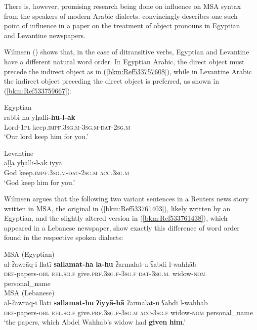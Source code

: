 \documentclass[output=paper]{langsci/langscibook}
\begin{document}
There is, however, promising research being done on influence on MSA syntax from the speakers of modern Arabic dialects. \citet{Wilmsen2010} convincingly describes one such point of influence in a paper on the treatment of object pronouns in Egyptian and Levantine newspapers.

Wilmsen (\citeyear[104]{Wilmsen2010}) shows that, in the case of ditransitive verbs, Egyptian and Levantine have a different natural word order. In Egyptian Arabic, the direct object must precede the indirect object as in (\ref{bkm:Ref533757608}), while in Levantine Arabic the indirect object preceding the direct object is preferred, as shown in (\ref{bkm:Ref533759667}):

\ea
\label{bkm:Ref533757608}Egyptian\\
\gll rabbi-na yḫalli\textbf{{}-hū-l-ak}\\
     Lord-\textsc{1pl} keep\textsc{.impf.3sg.m}{}-3\textsc{sg.m-dat-2sg.m}\\
\glt ‘Our lord keep him for you.’
\z

\ea\label{bkm:Ref533759667}Levantine\\
\gll aḷḷa yḫallī-l-ak iyyā\\
     God keep\textsc{.impf.3sg.m-dat-2sg.m} \textsc{acc.}3\textsc{sg.m} \\
\glt ‘God keep him for you.’\z

Wilmsen argues that the following two variant sentences in a Reuters news story written in MSA, the original in (\ref{bkm:Ref533761403}), likely written by an Egyptian, and the slightly altered version in (\ref{bkm:Ref533761438}), which appeared in a Lebanese newspaper, show exactly this difference of word order found in the respective spoken dialects:

\ea
\label{bkm:Ref533761403}MSA (Egyptian)\\
\gll al-ʔawrāq-i llatī \textbf{sallamat-hā} \textbf{la-hu} ʔarmalat-u ʕabdi l-wahhāb\\
     \textsc{def}{}-papers-\textsc{obl} \textsc{rel.sg.f} give.\textsc{prf.3sg.f-3sg.f} \textsc{dat-3sg.m.} widow-\textsc{nom} personal\_name\\
\z
\ea\label{bkm:Ref533761438}MSA (Lebanese)\\
\gll al-ʔawrāq-i llatī \textbf{sallamat-hu} \textbf{ʔiyyā-hā} ʔarmalat-u ʕabdi l-wahhāb\\
     \textsc{def}{}-papers-\textsc{obl} \textsc{rel.sg.f} give.\textsc{prf.3sg.f-3sg.m} \textsc{acc-3sg.f} widow-\textsc{nom} personal\_name\\
\glt ‘the papers, which Abdel Wahhab’s widow had \textbf{given} \textbf{him}.’\z
\end{document}
